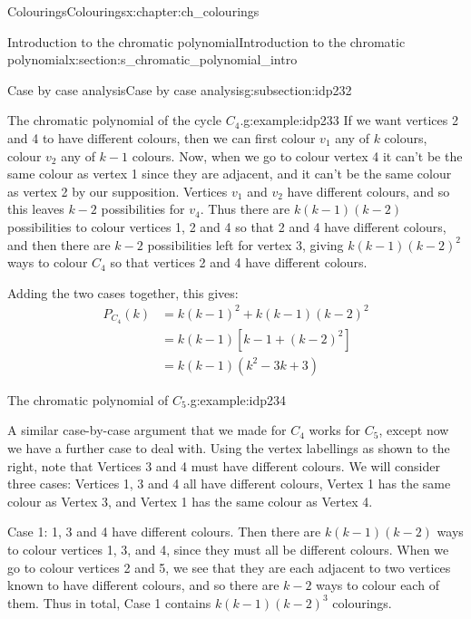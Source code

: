 \documentclass[oneside,10pt,]{book}
\numberwithin{equation}{section}
\newcommand{\amp}{&}
\begin{document}
\begin{chapterptx}{Colourings}{}{Colourings}{}{}{x:chapter:ch_colourings}
\begin{sectionptx}{Introduction to the chromatic polynomial}{}{Introduction to the chromatic polynomial}{}{}{x:section:s_chromatic_polynomial_intro}
\begin{subsectionptx}{Case by case analysis}{}{Case by case analysis}{}{}{g:subsection:idp232}
\begin{example}{The chromatic polynomial of the cycle \(C_4\).}{g:example:idp233}
If we want vertices 2 and 4 to have different colours, then we can first colour \(v_1\) any of \(k\) colours, colour \(v_2\) any of \(k-1\) colours.  Now, when we go to colour vertex 4 it can't be the same colour as vertex 1 since they are adjacent, and it can't be the same colour as vertex 2 by our supposition.  Vertices \(v_1\) and \(v_2\) have different colours, and so this leaves \(k-2\) possibilities for \(v_4\).  Thus there are \(k(k-1)(k-2)\) possibilities to colour vertices 1, 2 and 4 so that 2 and 4 have different colours, and then there are \(k-2\) possibilities left for vertex 3, giving \(k(k-1)(k-2)^2\) ways to colour \(C_4\) so that vertices 2 and 4 have different colours.%
\par
Adding the two cases together, this gives:%
%
\begin{align*}
P_{C_4}(k)\amp=k(k-1)^2+k(k-1)(k-2)^2\\
\amp=k(k-1)[k-1+(k-2)^2]\\
\amp=k(k-1)(k^2-3k+3)
\end{align*}
\end{example}
\begin{example}{The chromatic polynomial of \(C_5\).}{g:example:idp234}%
\begin{sidebyside}{2}{0.025}{0.025}{0.05}%
\begin{sbspanel}{0.6}%
A similar case-by-case argument that we made for \(C_4\) works for \(C_5\), except now we have a further case to deal with.  Using the vertex labellings as shown to the right, note that Vertices 3 and 4 must have different colours.  We will consider three cases: Vertices 1, 3 and 4 all have different colours, Vertex 1 has the same colour as Vertex 3, and Vertex 1 has the same colour as Vertex 4.%
\end{sbspanel}%
\begin{sbspanel}{0.3}%
%
\end{sbspanel}%
\end{sidebyside}%
Case 1: 1, 3 and 4 have different colours.  Then there are \(k(k-1)(k-2)\) ways to colour vertices 1, 3, and 4, since they must all be different colours.  When we go to colour vertices 2 and 5, we see that they are each adjacent to two vertices known to have different colours, and so there are \(k-2\) ways to colour each of them.  Thus in total, Case 1 contains \(k(k-1)(k-2)^3\) colourings.%

\end{example}
\end{subsectionptx}
\end{sectionptx}
\end{chapterptx}
\end{document}
